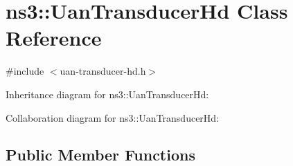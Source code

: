 \hypertarget{classns3_1_1UanTransducerHd}{}\section{ns3\+:\+:Uan\+Transducer\+Hd Class Reference}
\label{classns3_1_1UanTransducerHd}


{\ttfamily \#include $<$uan-\/transducer-\/hd.\+h$>$}



Inheritance diagram for ns3\+:\+:Uan\+Transducer\+Hd\+:


Collaboration diagram for ns3\+:\+:Uan\+Transducer\+Hd\+:
\subsection*{Public Member Functions}
